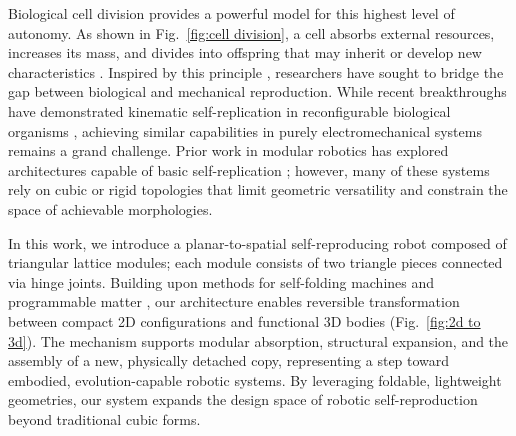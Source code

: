 \documentclass[lettersize,journal]{IEEEtran}
\begin{document}
Biological cell division provides a powerful model for this highest level of autonomy. As shown in Fig.~\ref{fig:cell division}, a cell absorbs external resources, increases its mass, and divides into offspring that may inherit or develop new characteristics \cite{XU2016516}. Inspired by this principle \cite{doi:10.1073/pnas.1017075108}, researchers have sought to bridge the gap between biological and mechanical reproduction. While recent breakthroughs have demonstrated kinematic self-replication in reconfigurable biological organisms \cite{kriegman2021kinematic}, achieving similar capabilities in purely electromechanical systems remains a grand challenge. Prior work in modular robotics has explored architectures capable of basic self-replication \cite{AbdelRahman2022}; however, many of these systems rely on cubic \cite{zykoy2005self} or rigid topologies that limit geometric versatility and constrain the space of achievable morphologies.


In this work, we introduce a planar-to-spatial self-reproducing robot composed of triangular lattice modules; each module consists of two triangle pieces connected via hinge joints. Building upon methods for self-folding machines and programmable matter \cite{felton2014method, hawkes2010programmable}, our architecture enables reversible transformation between compact 2D configurations and functional 3D bodies (Fig.~\ref{fig:2d to 3d}). The mechanism supports modular absorption, structural expansion, and the assembly of a new, physically detached copy, representing a step toward embodied, evolution-capable robotic systems. By leveraging foldable, lightweight geometries, our system expands the design space of robotic self-reproduction beyond traditional cubic forms.

\end{document}
